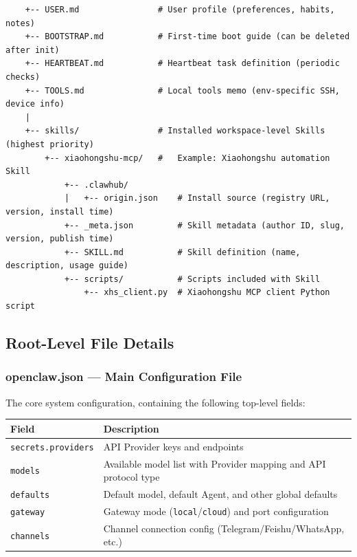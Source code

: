 \begin{lstlisting}
    +-- USER.md                # User profile (preferences, habits, notes)
    +-- BOOTSTRAP.md           # First-time boot guide (can be deleted after init)
    +-- HEARTBEAT.md           # Heartbeat task definition (periodic checks)
    +-- TOOLS.md               # Local tools memo (env-specific SSH, device info)
    |
    +-- skills/                # Installed workspace-level Skills (highest priority)
        +-- xiaohongshu-mcp/   #   Example: Xiaohongshu automation Skill
            +-- .clawhub/
            |   +-- origin.json    # Install source (registry URL, version, install time)
            +-- _meta.json         # Skill metadata (author ID, slug, version, publish time)
            +-- SKILL.md           # Skill definition (name, description, usage guide)
            +-- scripts/           # Scripts included with Skill
                +-- xhs_client.py  # Xiaohongshu MCP client Python script
\end{lstlisting}

\subsection{Root-Level File Details}


\subsubsection{openclaw.json --- Main Configuration File}


The core system configuration, containing the following top-level fields:

\begin{table}[h]
\centering
\small
\begin{tabular}{|l|l|}
\hline
Field & Description \\
\hline
\texttt{secrets.providers} & API Provider keys and endpoints \\
\hline
\texttt{models} & Available model list with Provider mapping and API protocol type \\
\hline
\texttt{defaults} & Default model, default Agent, and other global defaults \\
\hline
\texttt{gateway} & Gateway mode (\texttt{local}/\texttt{cloud}) and port configuration \\
\hline
\texttt{channels} & Channel connection config (Telegram/Feishu/WhatsApp, etc.) \\
\hline
\end{tabular}
\end{table}


